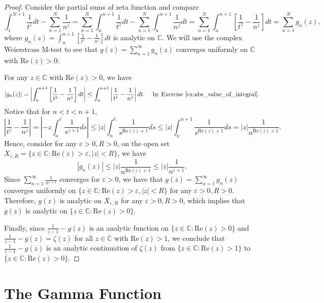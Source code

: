 \documentclass{elegantbook}
\begin{document}
\begin{proof}
  Consider the partial sums of zeta function and compare
  \[
    \int_{1}^{N+1}\frac{1}{t^z}dt - \sum_{n=1}^{N} \frac{1}{n^z} = \sum_{n=1}^{N} \int_{n}^{n+1} \frac{1}{t^z} dt - \sum_{n=1}^{N} \int_{n}^{n+1}\frac{1}{n^z} dt = \sum_{n=1}^{N} \int_{n}^{n+1} \left[ \frac{1}{t^z} - \frac{1}{n^z} \right] dt = \sum_{n=1}^{N} g_n(z),
  \]
  where $g_n(z)=\int_{n}^{n+1} \left[ \frac{1}{t^z} - \frac{1}{n^z} \right] dt$ is analytic on $\mathbb{C}$. We will use the complex Weierstrass M-test to see that $g(z) = \sum_{n=1}^{\infty} g_n(z)$ converges uniformly on $\mathbb{C}$ with $\mathrm{Re}(z) > 0$:

  For any $z\in\mathbb{C}$ with $\mathrm{Re}(z) > 0$, we have
  \[
    |g_n(z)| = \left| \int_{n}^{n+1} \left[ \frac{1}{t^z} - \frac{1}{n^z} \right] dt \right| \leq \int_{n}^{n+1} \left| \frac{1}{t^z} - \frac{1}{n^z} \right| dt. \quad \text{ by Exercise~\ref{ex:abs_value_of_integral}}.
  \]
  Notice that for $n<t<n+1$,
  \[
    \left| \frac{1}{t^z} - \frac{1}{n^z} \right| = \left| -z\int_{n}^{t} \frac{1}{s^{z+1}} ds \right| \leq |z| \int_{n}^{t} \frac{1}{s^{\mathrm{Re}(z)+1}} ds \leq |z| \int_{n}^{n+1} \frac{1}{s^{\mathrm{Re}(z)+1}} ds = |z| \frac{1}{n^{\mathrm{Re}(z)+1}}.
  \]
  Hence, consider for any $\varepsilon > 0, R>0$, on the open set $X_{\varepsilon,R}=\{z\in\mathbb{C} : \mathrm{Re}(z) > \varepsilon, |z| < R\}$, we have
  \[
    |g_n(z)| \leq |z| \frac{1}{n^{\mathrm{Re}(z)+1}} \leq |z| \frac{1}{n^{\varepsilon+1}}.
  \]
  Since $\sum_{n=1}^{\infty} \frac{1}{n^{\varepsilon+1}}$ converges for $\varepsilon > 0$, we have that $g(z) = \sum_{n=1}^{\infty} g_n(z)$ converges uniformly on $\{z\in\mathbb{C} : \mathrm{Re}(z) > \varepsilon, |z| < R\}$ for any $\varepsilon > 0, R>0$. Therefore, $g(z)$ is analytic on $X_{\varepsilon,R}$ for any $\varepsilon > 0, R>0$, which implies that $g(z)$ is analytic on $\{z\in\mathbb{C} : \mathrm{Re}(z) > 0\}$.

  Finally, since $\frac{1}{z-1} - g(z)$ is an analytic function on $\{z\in\mathbb{C} : \mathrm{Re}(z) > 0\}$ and $\frac{1}{z-1} - g(z) = \zeta(z)$ for all $z\in\mathbb{C}$ with $\mathrm{Re}(z) > 1$, we conclude that $\frac{1}{z-1} - g(z)$ is an analytic continuation of $\zeta(z)$ from $\{z\in\mathbb{C} : \mathrm{Re}(z) > 1\}$ to $\{z\in\mathbb{C} : \mathrm{Re}(z) > 0\}$.

\end{proof}


\section{The Gamma Function}
\end{document}
